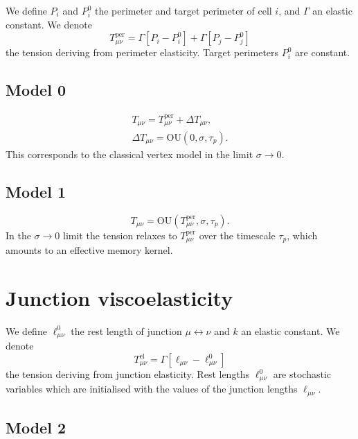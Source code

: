 \documentclass{revtex-custom}
\begin{document}
We define $P_i$ and $P_i^0$ the perimeter and target perimeter of cell $i$, and $\Gamma$ an elastic constant. We denote
\begin{equation}
T_{\mu\nu}^{\mathrm{per}} = \Gamma[P_i - P_i^0] + \Gamma[P_j - P_j^0]
\end{equation}
the tension deriving from perimeter elasticity. Target perimeters $P_i^0$ are constant.

\subsection{Model 0}

\begin{subequations}
\begin{align}
T_{\mu\nu} = T_{\mu\nu}^{\mathrm{per}} + \Delta T_{\mu\nu},\\
\Delta T_{\mu\nu} = \mathrm{OU}(0, \sigma, \tau_p).
\end{align}
\end{subequations}
This corresponds to the classical vertex model in the limit $\sigma \to 0$.

\subsection{Model 1}

\begin{equation}
T_{\mu\nu} = \mathrm{OU}(T_{\mu\nu}^{\mathrm{per}}, \sigma, \tau_p).
\end{equation}
In the $\sigma \to 0$ limit the tension relaxes to $T_{\mu\nu}^{\mathrm{per}}$ over the timescale $\tau_p$, which amounts to an effective memory kernel.

\section{Junction viscoelasticity}

We define $\ell_{\mu\nu}^0$ the rest length of junction $\mu \leftrightarrow \nu$ and $k$ an elastic constant. We denote
\begin{equation}
T_{\mu\nu}^{\mathrm{el}} = \Gamma [\ell_{\mu\nu} - \ell_{\mu\nu}^0]
\end{equation}
the tension deriving from junction elasticity. Rest lengths $\ell_{\mu\nu}^0$ are stochastic variables which are initialised with the values of the junction lengths $\ell_{\mu\nu}$.

\subsection{Model 2}
\end{document}
